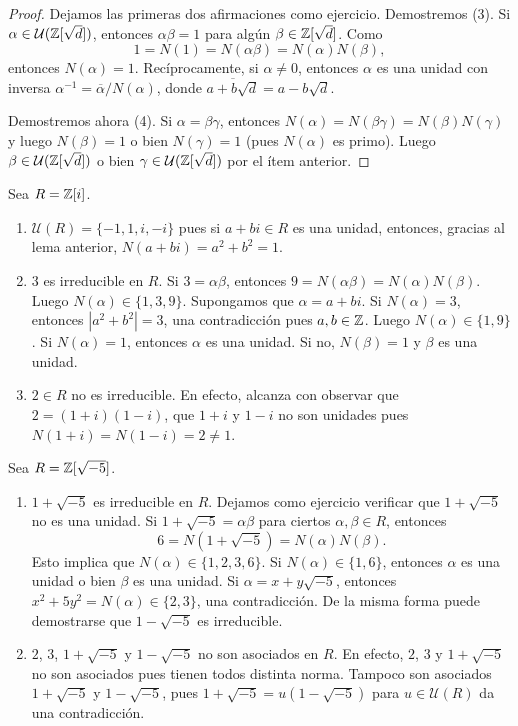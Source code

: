 \begin{proof}
Dejamos las primeras dos afirmaciones como ejercicio. Demostremos (3). Si $\alpha\in\mathcal{U}(\mathbb{Z}[\sqrt{d}])$, 
entonces $\alpha\beta=1$ para algún $\beta\in\mathbb{Z}[\sqrt{d}]$. Como
\[
1=N(1)=N(\alpha\beta)=N(\alpha)N(\beta),
\]
entonces $N(\alpha)=1$. Recíprocamente, si $\alpha\ne0$, entonces $\alpha$ es una unidad con inversa
$\alpha^{-1}=\overline{\alpha}/N(\alpha)$, 
donde $\overline{a+b\sqrt{d}}=a-b\sqrt{d}$.

Demostremos ahora (4). Si $\alpha=\beta\gamma$, entonces $N(\alpha)=N(\beta\gamma)=N(\beta)N(\gamma)$ y luego
$N(\beta)=1$ o bien $N(\gamma)=1$ (pues $N(\alpha)$ es primo). Luego
$\beta\in\mathcal{U}(\mathbb{Z}[\sqrt{d}])$ o bien $\gamma\in\mathcal{U}(\mathbb{Z}[\sqrt{d}])$ por el ítem anterior.
\end{proof}

\begin{example}
Sea $R=\mathbb{Z}[i]$. 
\begin{enumerate}
    \item $\mathcal{U}(R)=\{-1,1,i,-i\}$ pues si $a+bi\in R$ es una unidad, entonces, gracias al lema anterior, $N(a+bi)=a^2+b^2=1$.
    \item $3$ es irreducible en $R$. Si $3=\alpha\beta$, entonces
$9=N(\alpha\beta)=N(\alpha)N(\beta)$. Luego $N(\alpha)\in\{1,3,9\}$. Supongamos que $\alpha=a+bi$. Si $N(\alpha)=3$, entonces $|a^2+b^2|=3$, una contradicción pues $a,b\in\mathbb{Z}$. Luego $N(\alpha)\in\{1,9\}$. Si $N(\alpha)=1$, entonces $\alpha$ es una unidad. Si no, $N(\beta)=1$ y $\beta$ es una unidad. 	
\item $2\in R$ no es irreducible. En efecto, alcanza con observar que $2=(1+i)(1-i)$, que 
$1+i$ y $1-i$ no son unidades pues $N(1+ i)=N(1-i)=2\ne 1$. 
\end{enumerate}
\end{example}

\begin{example}
Sea $R=\mathbb{Z}[\sqrt{-5}]$. 
\begin{enumerate}
\item $1+\sqrt{-5}$ es irreducible en $R$. Dejamos como ejercicio verificar que $1+\sqrt{-5}$ no es una unidad. 
Si $1+\sqrt{-5}=\alpha\beta$ para ciertos $\alpha,
\beta\in R$, entonces 
\[
6=N(1+\sqrt{-5})=N(\alpha)N(\beta).
\]
Esto implica que $N(\alpha)\in\{1,2,3,6\}$. Si $N(\alpha)\in\{1,6\}$, entonces
$\alpha$ es una unidad o bien $\beta$ es una unidad. Si 
$\alpha=x+y\sqrt{-5}$, entonces  
$x^2+5y^2=N(\alpha)\in\{2,3\}$, una contradicción. De la misma forma puede demostrarse que $1-\sqrt{-5}$ 
es irreducible. 
\item $2$, $3$, $1+\sqrt{-5}$ y $1-\sqrt{-5}$ no son asociados en $R$. En efecto, $2$, $3$ y $1+\sqrt{-5}$ no son asociados
pues tienen todos distinta norma. Tampoco son asociados $1+\sqrt{-5}$ y $1-\sqrt{-5}$, pues $1+\sqrt{-5}=u(1-\sqrt{-5})$ 
para $u\in\mathcal{U}(R)$
da una contradicción. %
\end{enumerate}
\end{example}

